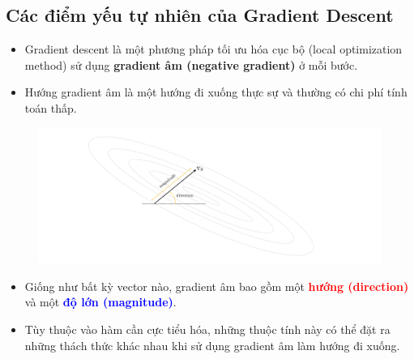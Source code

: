 \documentclass{book}
\begin{document}
\subsection{Các điểm yếu tự nhiên của Gradient Descent}
\begin{itemize}
    \item Gradient descent là một phương pháp tối ưu hóa cục bộ (local optimization method) sử dụng \textbf{gradient âm (negative gradient)} ở mỗi bước.
    \item Hướng gradient âm là một hướng đi xuống thực sự và thường có chi phí tính toán thấp.
\end{itemize}
\begin{figure}[H]
    \centering
    \includegraphics[width=\textwidth]{images/natural_weaknesses_of_gradient_descent.png}
\end{figure}
\begin{itemize}
    \item Giống như bất kỳ vector nào, gradient âm bao gồm một \textbf{\textcolor{red}{hướng (direction)}} và một \textbf{\textcolor{blue}{độ lớn (magnitude)}}.
    \item Tùy thuộc vào hàm cần cực tiểu hóa, những thuộc tính này có thể đặt ra những thách thức khác nhau khi sử dụng gradient âm làm hướng đi xuống.
\end{itemize}
\end{document}
